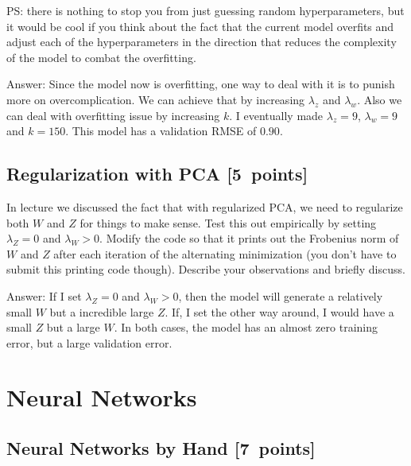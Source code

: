 \documentclass{article}
\newcommand{\blu}[1]{{\textcolor{blu}{#1}}}
\newenvironment{answer}{\par\begingroup\color{gre}Answer: }{\endgroup}
\let\ask\blu
\newcommand\pts[1]{\textcolor{pointscolour}{[#1~points]}}
\begin{document}
PS: there is nothing to stop you from just guessing random hyperparameters, but it would be cool if you think about the fact that the current model overfits and adjust each of the hyperparameters in the direction that reduces the complexity of the model to combat the overfitting.


\begin{answer}
	Since the model now is overfitting, one way to deal with it is to punish more on overcomplication. We can achieve that by increasing $\lambda_z$ and $\lambda_w$. Also we can deal with overfitting issue by increasing $k$. I eventually made $\lambda_z = 9$, $\lambda_w = 9$ and $k = 150$. This model has a validation RMSE of $0.90$.
\end{answer}
\subsection{Regularization with PCA \pts{5}}

In lecture we discussed the fact that with regularized PCA, we need to regularize both $W$ and $Z$ for things to make sense. Test this out empirically by setting $\lambda_Z=0$ and $\lambda_W>0$. Modify the code so that it prints out the Frobenius norm of $W$ and $Z$ after each iteration of the alternating minimization (you don't have to submit this printing code though). \ask{Describe your observations and briefly discuss.}

\begin{answer}
	If I set $\lambda_Z=0$ and $\lambda_W>0$, then the model will generate a relatively small $W$ but a incredible large $Z$. If, I set the other way around, I would have a small $Z$ but a large $W$. In both cases, the model has an almost zero training error, but a large validation error.
\end{answer}

\clearpage
\section{Neural Networks}

\subsection{Neural Networks by Hand \pts{7}}
\end{document}
